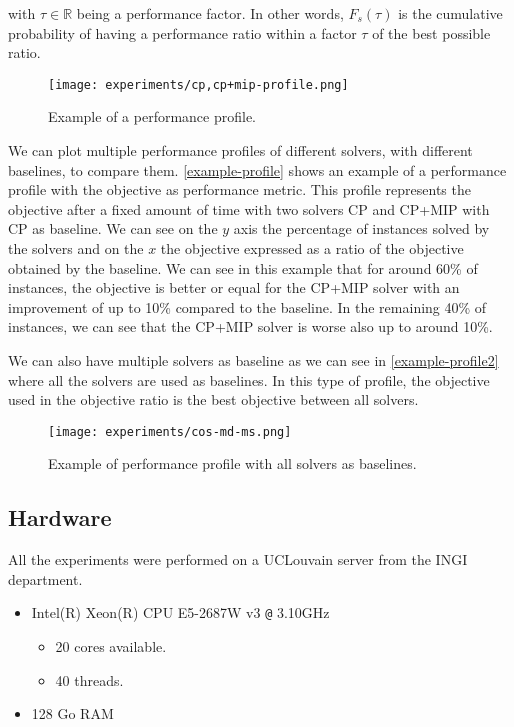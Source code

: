 \documentclass[../../thesis.tex]{subfiles}
\begin{document}
with $\tau \in \mathbb{R}$ being a performance factor. In other words, $F_s(\tau)$ is the cumulative probability
of having a performance ratio within a factor $\tau$ of the best possible ratio.

\begin{figure}
  \centering
  \texttt{[image: experiments/cp,cp+mip-profile.png]}
  \caption{Example of a performance profile.}
  \label{example-profile}
\end{figure}

We can plot multiple performance profiles of different solvers, with different baselines, to compare them.
\autoref{example-profile} shows an example of a performance profile with the objective as performance metric.
This profile represents the objective after a fixed amount of time 
with two solvers CP and CP+MIP with CP as 
baseline.
We can see on the $y$ axis the percentage of instances solved by the solvers and on the $x$ the objective expressed
as a ratio of the objective obtained by the baseline. We can see in this example that for around 60\% of instances,
the objective is better or equal for the CP+MIP solver with an improvement of up to 10\% compared to the baseline.
In the remaining 40\% of instances, we can see that the CP+MIP solver is worse also up to around 10\%.


We can also have multiple solvers as baseline as we can see in \autoref{example-profile2} where all the solvers 
are used as baselines. In this type of profile, the objective used in the objective ratio is the best objective between all solvers.

\begin{figure}
  \centering
  \texttt{[image: experiments/cos-md-ms.png]}
  \caption{Example of performance profile with all solvers as baselines.}
  \label{example-profile2}
\end{figure}


\subsection{Hardware}

All the experiments were performed on a UCLouvain server \cite{jabba} from the INGI department.

\begin{itemize}
  \item Intel(R) Xeon(R) CPU E5-2687W v3 \verb+@+ 3.10GHz 
    \begin{itemize}
      \item 20 cores available.
      \item 40 threads.
    \end{itemize}
  \item 128 Go RAM
\end{itemize}
\end{document}
